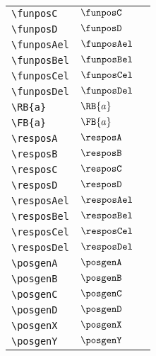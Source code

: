 \begin{longtable}{lll}
 {\color[rgb]{0.5,0.5,0.5}\texttt{\textbackslash funposC}} & $\funposC$ & \\ 
 {\color[rgb]{0.5,0.5,0.5}\texttt{\textbackslash funposD}} & $\funposD$ & \\ 
 {\color[rgb]{0.5,0.5,0.5}\texttt{\textbackslash funposAel}} & $\funposAel$ & \\ 
 {\color[rgb]{0.5,0.5,0.5}\texttt{\textbackslash funposBel}} & $\funposBel$ & \\ 
 {\color[rgb]{0.5,0.5,0.5}\texttt{\textbackslash funposCel}} & $\funposCel$ & \\ 
 {\color[rgb]{0.5,0.5,0.5}\texttt{\textbackslash funposDel}} & $\funposDel$ & \\ 
 {\color[rgb]{0.5,0.5,0.5}\texttt{\textbackslash RB\{a\}}} & $\RB{a}$ & \\ 
 {\color[rgb]{0.5,0.5,0.5}\texttt{\textbackslash FB\{a\}}} & $\FB{a}$ & \\ 
 {\color[rgb]{0.5,0.5,0.5}\texttt{\textbackslash resposA}} & $\resposA$ & \\ 
 {\color[rgb]{0.5,0.5,0.5}\texttt{\textbackslash resposB}} & $\resposB$ & \\ 
 {\color[rgb]{0.5,0.5,0.5}\texttt{\textbackslash resposC}} & $\resposC$ & \\ 
 {\color[rgb]{0.5,0.5,0.5}\texttt{\textbackslash resposD}} & $\resposD$ & \\ 
 {\color[rgb]{0.5,0.5,0.5}\texttt{\textbackslash resposAel}} & $\resposAel$ & \\ 
 {\color[rgb]{0.5,0.5,0.5}\texttt{\textbackslash resposBel}} & $\resposBel$ & \\ 
 {\color[rgb]{0.5,0.5,0.5}\texttt{\textbackslash resposCel}} & $\resposCel$ & \\ 
 {\color[rgb]{0.5,0.5,0.5}\texttt{\textbackslash resposDel}} & $\resposDel$ & \\ 
 {\color[rgb]{0.5,0.5,0.5}\texttt{\textbackslash posgenA}} & $\posgenA$ & \\ 
 {\color[rgb]{0.5,0.5,0.5}\texttt{\textbackslash posgenB}} & $\posgenB$ & \\ 
 {\color[rgb]{0.5,0.5,0.5}\texttt{\textbackslash posgenC}} & $\posgenC$ & \\ 
 {\color[rgb]{0.5,0.5,0.5}\texttt{\textbackslash posgenD}} & $\posgenD$ & \\ 
 {\color[rgb]{0.5,0.5,0.5}\texttt{\textbackslash posgenX}} & $\posgenX$ & \\ 
 {\color[rgb]{0.5,0.5,0.5}\texttt{\textbackslash posgenY}} & $\posgenY$ & \\ 

\end{longtable}
